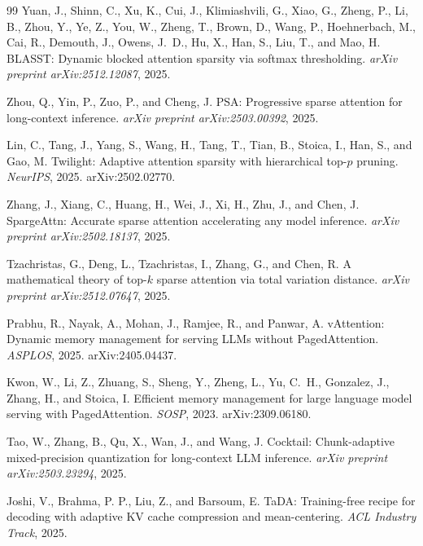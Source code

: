 \documentclass[10pt,twocolumn,a4paper]{article}
\theoremstyle{definition}
\theoremstyle{remark}
\begin{document}
\begin{thebibliography}{99}
Yuan, J., Shinn, C., Xu, K., Cui, J., Klimiashvili, G., Xiao, G., Zheng, P., Li, B., Zhou, Y., Ye, Z., You, W., Zheng, T., Brown, D., Wang, P., Hoehnerbach, M., Cai, R., Demouth, J., Owens, J.~D., Hu, X., Han, S., Liu, T., and Mao, H.
\newblock BLASST: Dynamic blocked attention sparsity via softmax thresholding.
\newblock \emph{arXiv preprint arXiv:2512.12087}, 2025.

Zhou, Q., Yin, P., Zuo, P., and Cheng, J.
\newblock PSA: Progressive sparse attention for long-context inference.
\newblock \emph{arXiv preprint arXiv:2503.00392}, 2025.

Lin, C., Tang, J., Yang, S., Wang, H., Tang, T., Tian, B., Stoica, I., Han, S., and Gao, M.
\newblock Twilight: Adaptive attention sparsity with hierarchical top-$p$ pruning.
\newblock \emph{NeurIPS}, 2025.
\newblock arXiv:2502.02770.

Zhang, J., Xiang, C., Huang, H., Wei, J., Xi, H., Zhu, J., and Chen, J.
\newblock SpargeAttn: Accurate sparse attention accelerating any model inference.
\newblock \emph{arXiv preprint arXiv:2502.18137}, 2025.

Tzachristas, G., Deng, L., Tzachristas, I., Zhang, G., and Chen, R.
\newblock A mathematical theory of top-$k$ sparse attention via total variation distance.
\newblock \emph{arXiv preprint arXiv:2512.07647}, 2025.

Prabhu, R., Nayak, A., Mohan, J., Ramjee, R., and Panwar, A.
\newblock vAttention: Dynamic memory management for serving LLMs without PagedAttention.
\newblock \emph{ASPLOS}, 2025.
\newblock arXiv:2405.04437.

Kwon, W., Li, Z., Zhuang, S., Sheng, Y., Zheng, L., Yu, C.~H., Gonzalez, J., Zhang, H., and Stoica, I.
\newblock Efficient memory management for large language model serving with PagedAttention.
\newblock \emph{SOSP}, 2023.
\newblock arXiv:2309.06180.

Tao, W., Zhang, B., Qu, X., Wan, J., and Wang, J.
\newblock Cocktail: Chunk-adaptive mixed-precision quantization for long-context LLM inference.
\newblock \emph{arXiv preprint arXiv:2503.23294}, 2025.

Joshi, V., Brahma, P. P., Liu, Z., and Barsoum, E.
\newblock TaDA: Training-free recipe for decoding with adaptive KV cache compression and mean-centering.
\newblock \emph{ACL Industry Track}, 2025.


\end{thebibliography}
\end{document}
